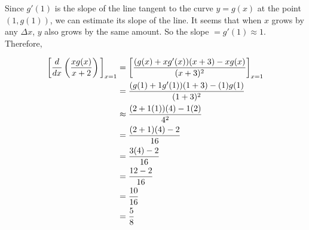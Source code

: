\documentclass[nooutcomes, handout]{ximera}
\begin{document}
\begin{problem}
\begin{freeResponse}
		Since $g'(1)$ is the slope of the line tangent to the curve $y=g(x)$ at the point $(1,g(1))$, we can estimate its slope of the line.  It seems that when $x$ grows by any $\Delta x$, $y$ also grows by the same amount.  So the slope $=g'(1) \approx 1$.  Therefore,

	\begin{align*}
	\bigg[  \frac{d}{dx} \left( \frac{xg(x)}{x+2}\right) \bigg]_{x=1}&= \bigg[ \frac{(g(x)+xg'(x))(x+3)-xg(x)}{(x+3)^2} \bigg]_{x=1}\\
	&=\frac{(g(1)+1g'(1))(1+3)-(1)g(1)}{(1+3)^2} \\
	& \approx \frac{(2+1(1))(4)-1(2)}{4^2}\\
	&=\frac{(2+1)(4)-2}{16}\\
	&= \frac{3(4)-2}{16}\\
	&= \frac{12-2}{16}\\
	&= \frac{10}{16}\\
	&=\frac{5}{8}
	\end{align*}



	\end{freeResponse}

\end{problem}	
	
	
			
			
\end{document}
